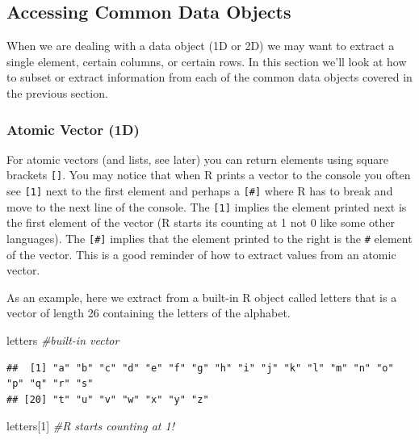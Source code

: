 \documentclass[
]{book}
\newenvironment{Shaded}{\begin{snugshade}}{\end{snugshade}}
\newcommand{\CommentTok}[1]{\textcolor[rgb]{0.56,0.35,0.01}{\textit{#1}}}
\newcommand{\DecValTok}[1]{\textcolor[rgb]{0.00,0.00,0.81}{#1}}
\newcommand{\NormalTok}[1]{#1}
\theoremstyle{definition}
\theoremstyle{definition}
\theoremstyle{definition}
\theoremstyle{remark}
\begin{document}
\hypertarget{accessing-common-data-objects}{%
\subsection{Accessing Common Data Objects}\label{accessing-common-data-objects}}

When we are dealing with a data object (1D or 2D) we may want to extract a single element, certain columns, or certain rows. In this section we'll look at how to subset or extract information from each of the common data objects covered in the previous section.

\hypertarget{atomic-vector-1d}{%
\subsubsection{Atomic Vector (1D)}\label{atomic-vector-1d}}

For atomic vectors (and lists, see later) you can return elements using square brackets \texttt{{[}{]}}. You may notice that when R prints a vector to the console you often see \texttt{{[}1{]}} next to the first element and perhaps a \texttt{{[}\#{]}} where R has to break and move to the next line of the console. The \texttt{{[}1{]}} implies the element printed next is the first element of the vector (R starts its counting at 1 not 0 like some other languages). The \texttt{{[}\#{]}} implies that the element printed to the right is the \texttt{\#} element of the vector. This is a good reminder of how to extract values from an atomic vector.

As an example, here we extract from a built-in R object called letters that is a vector of length 26 containing the letters of the alphabet.

\begin{Shaded}
\begin{Highlighting}[]
\NormalTok{letters }\CommentTok{#built-in vector}
\end{Highlighting}
\end{Shaded}

\begin{verbatim}
##  [1] "a" "b" "c" "d" "e" "f" "g" "h" "i" "j" "k" "l" "m" "n" "o" "p" "q" "r" "s"
## [20] "t" "u" "v" "w" "x" "y" "z"
\end{verbatim}

\begin{Shaded}
\begin{Highlighting}[]
\NormalTok{letters[}\DecValTok{1}\NormalTok{] }\CommentTok{#R starts counting at 1!}
\end{Highlighting}
\end{Shaded}
\end{document}

